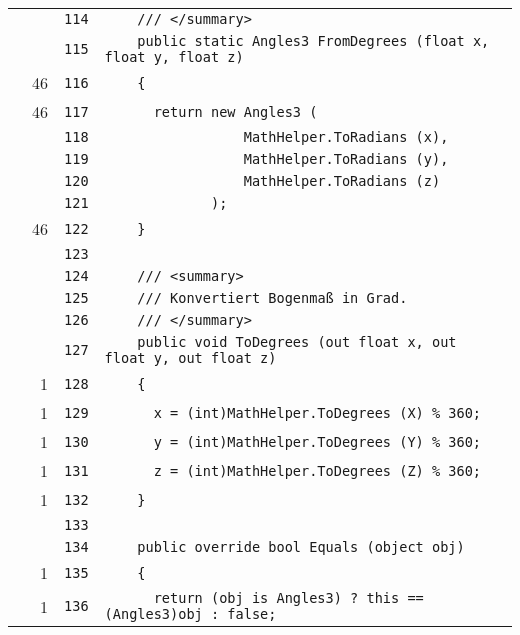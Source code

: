 \documentclass[a4paper,10pt]{article}
\begin{document}
\begin{longtable}[l]{lrrl}
\cellcolor{gray} &  & \verb~114~ & \verb~    /// </summary>~\\
\cellcolor{gray} &  & \verb~115~ & \verb~    public static Angles3 FromDegrees (float x, float y, float z)~\\
\cellcolor{green} & 46 & \verb~116~ & \verb~    {~\\
\cellcolor{green} & 46 & \verb~117~ & \verb~      return new Angles3 (~\\
\cellcolor{gray} &  & \verb~118~ & \verb~                 MathHelper.ToRadians (x),~\\
\cellcolor{gray} &  & \verb~119~ & \verb~                 MathHelper.ToRadians (y),~\\
\cellcolor{gray} &  & \verb~120~ & \verb~                 MathHelper.ToRadians (z)~\\
\cellcolor{gray} &  & \verb~121~ & \verb~             );~\\
\cellcolor{green} & 46 & \verb~122~ & \verb~    }~\\
\cellcolor{gray} &  & \verb~123~ & \verb~~\\
\cellcolor{gray} &  & \verb~124~ & \verb~    /// <summary>~\\
\cellcolor{gray} &  & \verb~125~ & \verb~    /// Konvertiert Bogenmaß in Grad.~\\
\cellcolor{gray} &  & \verb~126~ & \verb~    /// </summary>~\\
\cellcolor{gray} &  & \verb~127~ & \verb~    public void ToDegrees (out float x, out float y, out float z)~\\
\cellcolor{green} & 1 & \verb~128~ & \verb~    {~\\
\cellcolor{green} & 1 & \verb~129~ & \verb~      x = (int)MathHelper.ToDegrees (X) % 360;~\\
\cellcolor{green} & 1 & \verb~130~ & \verb~      y = (int)MathHelper.ToDegrees (Y) % 360;~\\
\cellcolor{green} & 1 & \verb~131~ & \verb~      z = (int)MathHelper.ToDegrees (Z) % 360;~\\
\cellcolor{green} & 1 & \verb~132~ & \verb~    }~\\
\cellcolor{gray} &  & \verb~133~ & \verb~~\\
\cellcolor{gray} &  & \verb~134~ & \verb~    public override bool Equals (object obj)~\\
\cellcolor{green} & 1 & \verb~135~ & \verb~    {~\\
\cellcolor{green} & 1 & \verb~136~ & \verb~      return (obj is Angles3) ? this == (Angles3)obj : false;~\\

\end{longtable}
\end{document}
